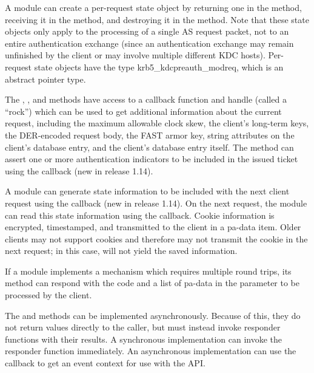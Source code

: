 \documentclass[letterpaper,10pt,english]{sphinxmanual}
\begin{document}
A module can create a per-request state object by returning one in the
 method, receiving it in the  method, and
destroying it in the  method.  Note that these state
objects only apply to the processing of a single AS request packet,
not to an entire authentication exchange (since an authentication
exchange may remain unfinished by the client or may involve multiple
different KDC hosts).  Per-request state objects have the type
krb5\_kdcpreauth\_modreq, which is an abstract pointer type.

The , , and  methods have access
to a callback function and handle (called a “rock”) which can be used
to get additional information about the current request, including the
maximum allowable clock skew, the client’s long-term keys, the
DER-encoded request body, the FAST armor key, string attributes on the
client’s database entry, and the client’s database entry itself.  The
 method can assert one or more authentication indicators to
be included in the issued ticket using the 
callback (new in release 1.14).

A module can generate state information to be included with the next
client request using the  callback (new in release
1.14).  On the next request, the module can read this state
information using the  callback.  Cookie information is
encrypted, timestamped, and transmitted to the client in a
 pa-data item.  Older clients may not support cookies
and therefore may not transmit the cookie in the next request; in this
case,  will not yield the saved information.

If a module implements a mechanism which requires multiple round
trips, its  method can respond with the code
 and a list of pa-data in
the  parameter to be processed by the client.

The  and  methods can be implemented
asynchronously.  Because of this, they do not return values directly
to the caller, but must instead invoke responder functions with their
results.  A synchronous implementation can invoke the responder
function immediately.  An asynchronous implementation can use the
callback to get an event context for use with the  API.
\end{document}
